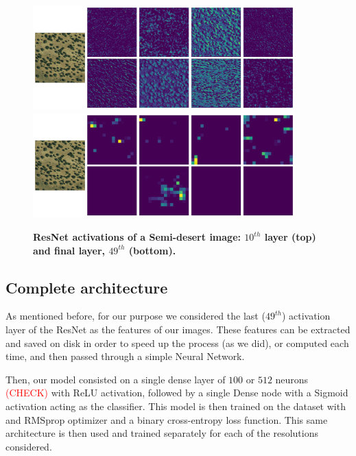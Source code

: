 \begin{figure}[h!]
	\centering
	\includegraphics[width=0.9\textwidth]{Figures/activations/semi-desert_l0_s1_activation_10.png}
	\includegraphics[width=0.9\textwidth]{Figures/activations/semi-desert_l0_s1_activation_49.png}
	\captionsetup{width=1\linewidth}
	\caption{\textbf{ResNet activations of a Semi-desert image: $10^{th}$ layer (top) and final layer, $49^{th}$ (bottom).}}
	\label{fig:act_semi_desert}
\end{figure}

\subsection{Complete architecture}

As mentioned before, for our purpose we considered the last ($49^{th}$) activation layer of the ResNet as the features of our images. These features can be extracted and saved on disk in order to speed up the process (as we did), or computed each time, and then passed through a simple Neural Network.

Then, our model consisted on a single dense layer of $100$ or $512$ neurons \textcolor{red}{(CHECK)} with ReLU activation, followed by a single Dense node with a Sigmoid activation acting as the classifier. This model is then trained on the dataset with and RMSprop optimizer and a binary cross-entropy loss function. This same architecture is then used and trained separately for each of the resolutions considered.

\

